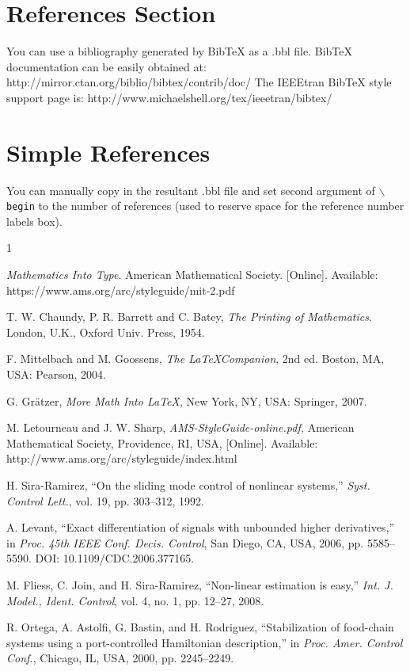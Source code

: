 \section{References Section}
You can use a bibliography generated by BibTeX as a .bbl file.
 BibTeX documentation can be easily obtained at:
 http://mirror.ctan.org/biblio/bibtex/contrib/doc/
 The IEEEtran BibTeX style support page is:
 http://www.michaelshell.org/tex/ieeetran/bibtex/
 
%
%
\section{Simple References}
You can manually copy in the resultant .bbl file and set second argument of $\backslash${\tt{begin}} to the number of references
 (used to reserve space for the reference number labels box).

\begin{thebibliography}{1}


{\it{Mathematics Into Type}}. American Mathematical Society. [Online]. Available: https://www.ams.org/arc/styleguide/mit-2.pdf

T. W. Chaundy, P. R. Barrett and C. Batey, {\it{The Printing of Mathematics}}. London, U.K., Oxford Univ. Press, 1954.

F. Mittelbach and M. Goossens, {\it{The \LaTeX Companion}}, 2nd ed. Boston, MA, USA: Pearson, 2004.

G. Gr\"atzer, {\it{More Math Into LaTeX}}, New York, NY, USA: Springer, 2007.

M. Letourneau and J. W. Sharp, {\it{AMS-StyleGuide-online.pdf,}} American Mathematical Society, Providence, RI, USA, [Online]. Available: http://www.ams.org/arc/styleguide/index.html

H. Sira-Ramirez, ``On the sliding mode control of nonlinear systems,'' \textit{Syst. Control Lett.}, vol. 19, pp. 303--312, 1992.

A. Levant, ``Exact differentiation of signals with unbounded higher derivatives,''  in \textit{Proc. 45th IEEE Conf. Decis.
Control}, San Diego, CA, USA, 2006, pp. 5585--5590. DOI: 10.1109/CDC.2006.377165.

M. Fliess, C. Join, and H. Sira-Ramirez, ``Non-linear estimation is easy,'' \textit{Int. J. Model., Ident. Control}, vol. 4, no. 1, pp. 12--27, 2008.

R. Ortega, A. Astolfi, G. Bastin, and H. Rodriguez, ``Stabilization of food-chain systems using a port-controlled Hamiltonian description,'' in \textit{Proc. Amer. Control Conf.}, Chicago, IL, USA,
2000, pp. 2245--2249.

\end{thebibliography}


